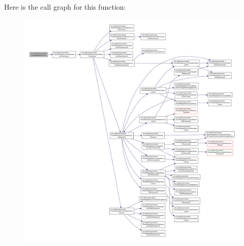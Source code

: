 Here is the call graph for this function\-:
\nopagebreak
\begin{figure}[H]
\begin{center}
\leavevmode
\includegraphics[width=350pt]{classcom_1_1android_1_1server_1_1power_1_1PowerManagerService_af4ef6caf8d8906988b32470167669ec6_cgraph}
\end{center}
\end{figure}


